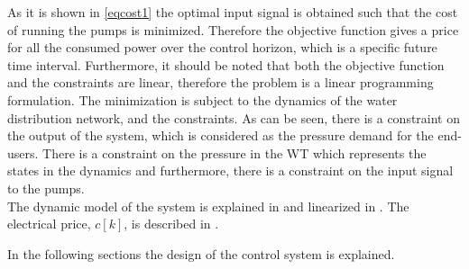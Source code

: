 As it is shown in \eqref{eqcost1} the optimal input signal is obtained such that the cost of running the pumps is minimized. Therefore the objective function gives a price for all the consumed power over the control horizon, which is a specific future time interval. Furthermore, it should be noted that both the objective function and the constraints are linear, therefore the problem is a linear programming formulation. The minimization is subject to the dynamics of the water distribution network, and the constraints. As can be seen, there is a constraint on the output of the system, which is considered as the pressure demand for the end-users. There is a constraint on the pressure in the WT which represents the states in the dynamics and furthermore, there is a constraint on the input signal to the pumps. 
\\
The dynamic model of the system is explained in  and linearized in . The electrical price, $c[k]$, is described in . %

In the following sections the design of the control system is explained. 







